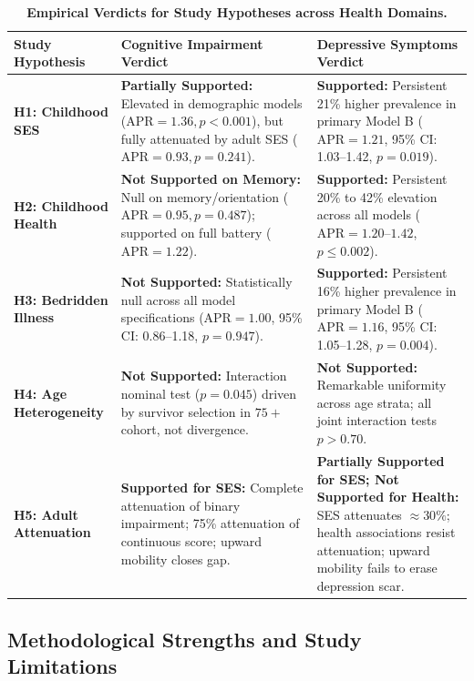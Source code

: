 \begin{table}[!htbp]
\centering
\small
\caption{\textbf{Empirical Verdicts for Study Hypotheses across Health Domains.}}
\label{tab:hypo_summary}
\begin{tabularx}{\textwidth}{lXX}
\toprule
\textbf{Study Hypothesis} & \textbf{Cognitive Impairment Verdict} & \textbf{Depressive Symptoms Verdict} \\
\midrule
\textbf{H1: Childhood SES} & \textbf{Partially Supported:} Elevated in demographic models ($\text{APR}=1.36, p<0.001$), but fully attenuated by adult SES ($\text{APR}=0.93, p=0.241$). & \textbf{Supported:} Persistent 21\% higher prevalence in primary Model B ($\text{APR}=1.21$, 95\% CI: 1.03--1.42, $p=0.019$). \\
\addlinespace
\textbf{H2: Childhood Health} & \textbf{Not Supported on Memory:} Null on memory/orientation ($\text{APR}=0.95, p=0.487$); supported on full battery ($\text{APR}=1.22$). & \textbf{Supported:} Persistent 20\% to 42\% elevation across all models ($\text{APR}=1.20$--$1.42$, $p \le 0.002$). \\
\addlinespace
\textbf{H3: Bedridden Illness} & \textbf{Not Supported:} Statistically null across all model specifications ($\text{APR}=1.00$, 95\% CI: 0.86--1.18, $p=0.947$). & \textbf{Supported:} Persistent 16\% higher prevalence in primary Model B ($\text{APR}=1.16$, 95\% CI: 1.05--1.28, $p=0.004$). \\
\addlinespace
\textbf{H4: Age Heterogeneity} & \textbf{Not Supported:} Interaction nominal test ($p=0.045$) driven by survivor selection in $75+$ cohort, not divergence. & \textbf{Not Supported:} Remarkable uniformity across age strata; all joint interaction tests $p > 0.70$. \\
\addlinespace
\textbf{H5: Adult Attenuation} & \textbf{Supported for SES:} Complete attenuation of binary impairment; 75\% attenuation of continuous score; upward mobility closes gap. & \textbf{Partially Supported for SES; Not Supported for Health:} SES attenuates $\approx 30\%$; health associations resist attenuation; upward mobility fails to erase depression scar. \\
\bottomrule
\end{tabularx}
\end{table}

\subsection{Methodological Strengths and Study Limitations}


